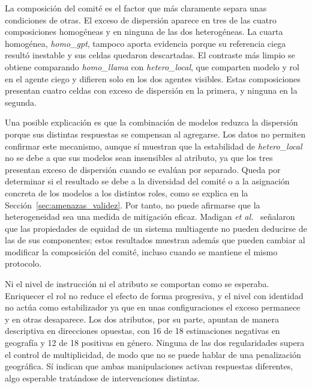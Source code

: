 La composición del comité es el factor que más claramente separa unas condiciones de otras. El exceso de dispersión aparece en tres de las cuatro composiciones homogéneas y en ninguna de las dos heterogéneas. La cuarta homogénea, \textit{homo\_gpt}, tampoco aporta evidencia porque su referencia ciega resultó inestable y sus celdas quedaron descartadas. El contraste más limpio se obtiene comparando \textit{homo\_llama} con \textit{hetero\_local}, que comparten modelo y rol en el agente ciego y difieren solo en los dos agentes visibles. Estas composiciones presentan cuatro celdas con exceso de dispersión en la primera, y ninguna en la segunda.

Una posible explicación es que la combinación de modelos reduzca la dispersión porque sus distintas respuestas se compensan al agregarse. Los datos no permiten confirmar este mecanismo, aunque sí muestran que la estabilidad de \textit{hetero\_local} no se debe a que sus modelos sean insensibles al atributo, ya que los tres presentan exceso de dispersión cuando se evalúan por separado. Queda por determinar si el resultado se debe a la diversidad del comité o a la asignación concreta de los modelos a los distintos roles, como se explica en la Sección~\ref{sec:amenazas_validez}. Por tanto, no puede afirmarse que la heterogeneidad sea una medida de mitigación eficaz. Madigan \textit{et al.}~\cite{madigan2025emergent} señalaron que las propiedades de equidad de un sistema multiagente no pueden deducirse de las de sus componentes; estos resultados muestran además que pueden cambiar al modificar la composición del comité, incluso cuando se mantiene el mismo protocolo.


Ni el nivel de instrucción ni el atributo se comportan como se esperaba. Enriquecer el rol no reduce el efecto de forma progresiva, y el nivel con identidad no actúa como estabilizador ya que en unas configuraciones el exceso permanece y en otras desaparece. Los dos atributos, por su parte, apuntan de manera descriptiva en direcciones opuestas, con 16 de 18 estimaciones negativas en geografía y 12 de 18 positivas en género. Ninguna de las dos regularidades supera el control de multiplicidad, de modo que no se puede hablar de una penalización geográfica. Sí indican que ambas manipulaciones activan respuestas diferentes, algo esperable tratándose de intervenciones distintas.

